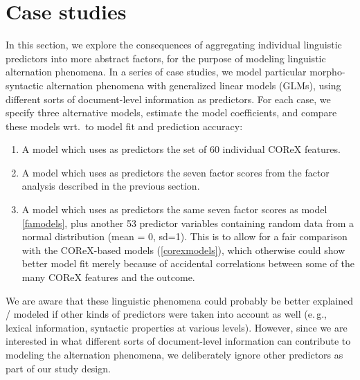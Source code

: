 \section{Case studies}
\label{sec:case-studies}
In this section, we explore the consequences of aggregating individual linguistic predictors into more abstract factors, for the purpose of modeling linguistic alternation phenomena.
In a series of case studies, we model particular morpho-syntactic alternation phenomena with generalized linear models (GLMs), using different sorts of document-level information as predictors. For each case, we specify three alternative models, estimate the model coefficients, and compare these models wrt.\ to model fit and prediction accuracy:

\begin{enumerate}
  \item\label{corexmodels} A model which uses as predictors the set of 60 individual COReX features.
  \item\label{famodels} A model which uses as predictors the seven factor scores from the factor analysis described in the previous section.
  \item A model which uses as predictors the same seven factor scores as model \ref{famodels}, plus another 53 predictor variables containing random data from a normal distribution (mean = 0, sd=1). This is to allow for a fair comparison with the COReX-based models (\ref{corexmodels}), which otherwise could show better model fit merely because of accidental correlations between some of the many COReX features and the outcome.
\end{enumerate}

We are aware that these linguistic phenomena could probably be better explained / modeled if other kinds of predictors were taken into account as well (e.\,g., lexical information, syntactic properties at various levels).
However, since we are interested in what different sorts of document-level information can contribute to modeling the alternation phenomena, we deliberately ignore other predictors as part of our study design.

